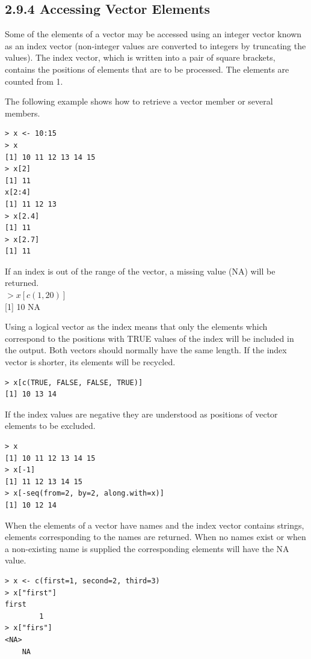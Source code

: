 \documentclass[10pt]{book}
\begin{document}
\subsection*{2.9.4 Accessing Vector Elements}
Some of the elements of a vector may be accessed using an integer vector known as an index vector (non-integer values are converted to integers by truncating the values). The index vector, which is written into a pair of square brackets, contains the positions of elements that are to be processed. The elements are counted from 1.

The following example shows how to retrieve a vector member or several members.

\begin{verbatim}
> x <- 10:15
> x
[1] 10 11 12 13 14 15
> x[2]
[1] 11
x[2:4]
[1] 11 12 13
> x[2.4]
[1] 11
> x[2.7]
[1] 11
\end{verbatim}

If an index is out of the range of the vector, a missing value (NA) will be returned.\\
$>x[c(1,20)]$\\[0pt]
[1] 10 NA

Using a logical vector as the index means that only the elements which correspond to the positions with TRUE values of the index will be included in the output. Both vectors should normally have the same length. If the index vector is shorter, its elements will be recycled.

\begin{verbatim}
> x[c(TRUE, FALSE, FALSE, TRUE)]
[1] 10 13 14
\end{verbatim}

If the index values are negative they are understood as positions of vector elements to be excluded.

\begin{verbatim}
> x
[1] 10 11 12 13 14 15
> x[-1]
[1] 11 12 13 14 15
> x[-seq(from=2, by=2, along.with=x)]
[1] 10 12 14
\end{verbatim}

When the elements of a vector have names and the index vector contains strings, elements corresponding to the names are returned. When no names exist or when a non-existing name is supplied the corresponding elements will have the NA value.

\begin{verbatim}
> x <- c(first=1, second=2, third=3)
> x["first"]
first
        1
> x["firs"]
<NA>
    NA
\end{verbatim}
\end{document}
